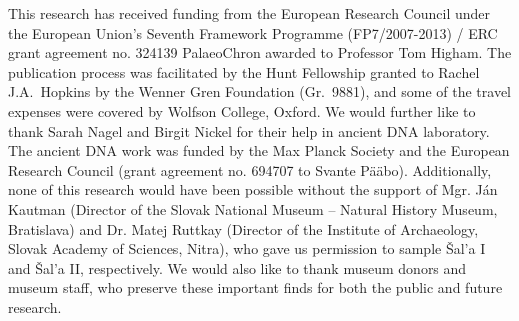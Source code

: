 \documentclass[a4paper,10pt]{article}
\begin{document}
This research has received funding from the European Research Council under the European Union’s Seventh Framework Programme (FP7/2007-2013) / ERC grant agreement no. 324139 PalaeoChron awarded to Professor Tom Higham. The publication process was facilitated by the Hunt Fellowship granted to Rachel J.A.~Hopkins by the Wenner Gren Foundation (Gr.~9881), and some of the travel expenses were covered by Wolfson College, Oxford. We would further like to thank Sarah Nagel and Birgit Nickel for their help in ancient DNA laboratory. The ancient DNA work was funded by the Max Planck Society and the European Research Council (grant agreement no. 694707 to Svante Pääbo). Additionally, none of this research would have been possible without the support of Mgr. Ján Kautman (Director of the Slovak National Museum -- Natural History Museum, Bratislava) and Dr. Matej Ruttkay (Director of the Institute of Archaeology, Slovak Academy of Sciences, Nitra), who gave us permission to sample Šal'a I and Šal'a II, respectively. We would also like to thank museum donors and museum staff, who preserve these important finds for both the public and future research.





 
 
\end{document}
